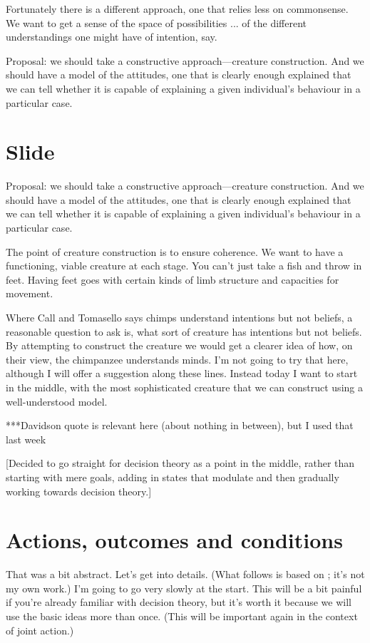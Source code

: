 \documentclass[12pt,\papersize]{extarticle}
\begin{document}
Fortunately there is a different approach, one that relies less on commonsense.
We want to get a sense of the space of possibilities ... of the different understandings one might have of intention, say.

Proposal: we should take a constructive approach---creature construction.
And we should have a model of the attitudes, one that is clearly enough explained that we can tell whether it is capable of explaining a given individual’s behaviour in a particular case.


\section{Slide}
Proposal: we should take a constructive approach---creature construction.
And we should have a model of the attitudes, one that is clearly enough explained that we can tell whether it is capable of explaining a given individual’s behaviour in a particular case.

The point of creature construction is to ensure coherence.  We want to have a functioning, viable creature at each stage.  You can’t just take a fish and throw in feet.  Having feet goes with certain kinds of limb structure and capacities for movement.

Where Call and Tomasello says chimps understand intentions but not beliefs, a reasonable question to ask is, what sort of creature has intentions but not beliefs.  By attempting to construct the creature we would get a clearer idea of how, on their view, the chimpanzee understands minds.  I’m not going to try that here, although I will offer a suggestion along these lines.  Instead today I want to start in the middle, with the most sophisticated creature that we can construct using a well-understood model.

***Davidson quote is relevant here (about nothing in between), but I used that last week

[Decided to go straight for decision theory as a point in the middle, rather than starting with mere goals, adding in states that modulate and then gradually working towards decision theory.]


\section{Actions, outcomes and conditions}
That was a bit abstract.
Let's get into details.
(What follows is based on \citealp{Jeffrey:1983oe}; it's not my own work.) 
I'm going to go very slowly at the start. 
This will be a bit painful if you're already familiar with decision theory, but it's worth it because we will use the basic ideas more than once.
(This will be important again in the context of joint action.)
\end{document}
